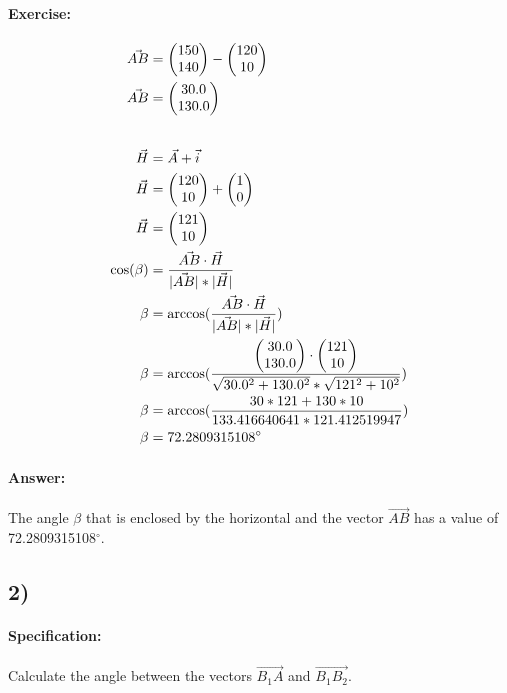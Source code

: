\documentclass{article}
\begin{document}
\paragraph{Exercise:} 
\begin{align*}
    \vec{AB} &= \vBOne - \vA \\
    \vec{AB} &= \vAB \\[20pt]
    \vec{H} &= \vec{A} + \vec{i} \\
    \vec{H} &= \vA  + \vI \\
    \vec{H} &= \vH \\
    \cos(\beta) &= \frac{\vec{AB} \cdot \vec{H}}{|\vec{AB}| * |\vec{H}|} \\
    \beta &= \arccos(\frac{\vec{AB} \cdot \vec{H}}{|\vec{AB}| * |\vec{H}|}) \\
    \beta &= \arccos(\frac{\vAB \cdot \vH}{\sqrt{\vABX^2 + \vABY^2} * \sqrt{121^2+ 10^2}}) \\
    \beta &= \arccos(\frac{30 * 121 + 130 * 10}{133.416640641 * 121.412519947}) \\
    \beta &= 72.2809315108^\circ
\end{align*}

\paragraph{Answer:} 
The angle $\beta$ that is enclosed by the horizontal and the vector $\vec{AB}$ has a value
of 72.2809315108$^\circ$.

\subsection*{2)}

\paragraph{Specification:}
Calculate the angle between the vectors $\vec{B_1A}$ and $\vec{B_1B_2}$.

\def\vBOneAX{\pgfmathparse{\pAX - \pBOneX}\pgfmathresult}
\def\vBOneAY{\pgfmathparse{\pAY - \pBOneY}\pgfmathresult}
\def\vBOneA{\begin{pmatrix}
    \vBOneAX \\ 
    \vBOneAY 
\end{pmatrix}}

\def\vBOneBTwoX{\pgfmathparse{\pBTwoX - \pBOneX}\pgfmathresult}
\def\vBOneBTwoY{\pgfmathparse{\pBTwoY - \pBOneY}\pgfmathresult}
\def\vBOneBTwo{\begin{pmatrix}
    \vBOneBTwoX \\ 
    \vBOneBTwoY
\end{pmatrix}}
\end{document}
